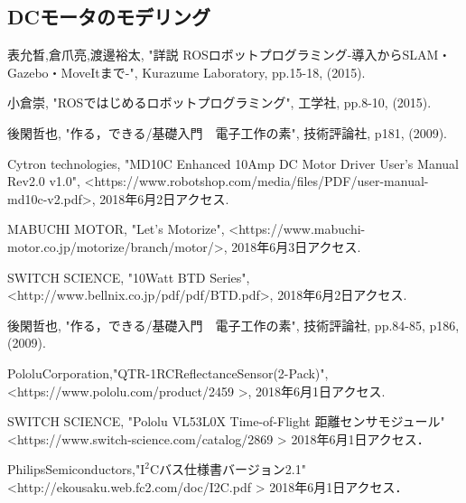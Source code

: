 \documentclass[11pt,a4j]{jarticle}
\begin{document}
\subsection{DCモータのモデリング}


\begin{thebibliography}{9}
    表允晳,倉爪亮,渡邊裕太, "詳説 ROSロボットプログラミング-導入からSLAM・Gazebo・MoveItまで-", 
    Kurazume Laboratory, pp.15-18, (2015).

    小倉崇, "ROSではじめるロボットプログラミング", 工学社, pp.8-10, (2015).
  
  後閑哲也, "作る，できる/基礎入門　電子工作の素", 技術評論社, p181, (2009).
  
  Cytron technologies, "MD10C Enhanced 10Amp DC Motor Driver User's Manual Rev2.0 v1.0", 
  \textless https://www.robotshop.com/media/files/PDF/user-manual-md10c-v2.pdf\textgreater , 2018年6月2日アクセス.
  
  MABUCHI MOTOR, "Let's Motorize", 
  \textless https://www.mabuchi-motor.co.jp/motorize/branch/motor/\textgreater , 2018年6月3日アクセス.
  
  SWITCH SCIENCE, "10Watt BTD Series", 
  \textless http://www.bellnix.co.jp/pdf/pdf/BTD.pdf\textgreater , 2018年6月2日アクセス.
  
  後閑哲也, "作る，できる/基礎入門　電子工作の素", 技術評論社, pp.84-85, p186, (2009).
  
   Pololu\quad Corporation,\quad "QTR-1RC\quad Reflectance\quad Sensor(2-Pack)",
   \textless https://www.pololu.com/product/2459 \textgreater , 2018年6月1日アクセス.
   
  SWITCH SCIENCE, "Pololu VL53L0X Time-of-Flight 距離センサモジュール"
  \textless https://www.switch-science.com/catalog/2869 \textgreater
  2018年6月1日アクセス．
  
  Philips\quad Semiconductors,\quad "$\mathrm{I^2C}$\hspace{0.5em}バス仕様書バージョン2.1"　　　　　　　　　　
  \textless http://ekousaku.web.fc2.com/doc/I2C.pdf \textgreater
  \quad 2018年6月1日アクセス．
  

\end{thebibliography}
\end{document}
